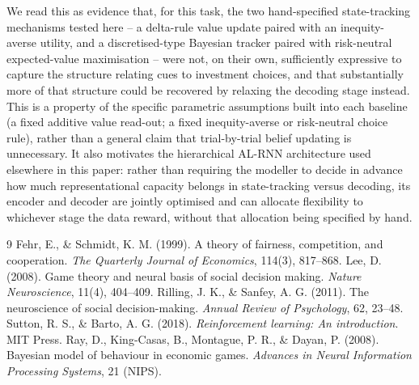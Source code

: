 \documentclass[11pt]{article}
\begin{document}
We read this as evidence that, for this task, the two hand-specified
state-tracking mechanisms tested here -- a delta-rule value update paired
with an inequity-averse utility, and a discretised-type Bayesian tracker
paired with risk-neutral expected-value maximisation -- were not, on their
own, sufficiently expressive to capture the structure relating cues to
investment choices, and that substantially more of that structure could be
recovered by relaxing the decoding stage instead. This is a property of
the specific parametric assumptions built into each baseline (a fixed
additive value read-out; a fixed inequity-averse or risk-neutral choice
rule), rather than a general claim that trial-by-trial belief updating is
unnecessary. It also motivates the hierarchical AL-RNN architecture used
elsewhere in this paper: rather than requiring the modeller to decide in
advance how much representational capacity belongs in state-tracking
versus decoding, its encoder and decoder are jointly optimised and can
allocate flexibility to whichever stage the data reward, without that
allocation being specified by hand.

\begin{thebibliography}{9}
 Fehr, E., \& Schmidt, K. M. (1999). A theory of
  fairness, competition, and cooperation. \textit{The Quarterly Journal of
  Economics}, 114(3), 817--868.
 Lee, D. (2008). Game theory and neural basis of social
  decision making. \textit{Nature Neuroscience}, 11(4), 404--409.
 Rilling, J. K., \& Sanfey, A. G. (2011). The
  neuroscience of social decision-making. \textit{Annual Review of
  Psychology}, 62, 23--48.
 Sutton, R. S., \& Barto, A. G. (2018).
  \textit{Reinforcement learning: An introduction}. MIT Press.
 Ray, D., King-Casas, B., Montague, P. R., \& Dayan, P.
  (2008). Bayesian model of behaviour in economic games. \textit{Advances
  in Neural Information Processing Systems}, 21 (NIPS).
\end{thebibliography}
\end{document}
